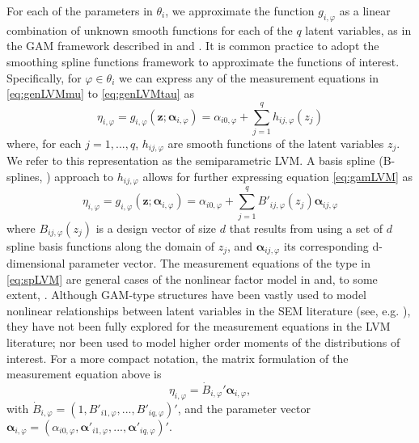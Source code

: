 \documentclass[11pt, a4paper]{article}
\begin{document}
For each of the parameters in $\theta_i$, we approximate the function $g_{i,\varphi}$ as a linear combination of unknown smooth functions for each of the $q$ latent variables, as in the GAM framework described in \citet{HT1990} and \citet{Woods2017}. It is common practice to adopt the smoothing spline functions \citep{Eilers&Marx_StatSci1996, deBoor2001} framework to approximate the functions of interest. Specifically, for $\varphi \in \theta_i$ we can express any of the measurement equations in \eqref{eq:genLVMmu} to \eqref{eq:genLVMtau} as
\begin{equation}
 \eta_{i,\varphi} = g_{i,\varphi}(\mathbf{z}; \bm{\alpha}_{i,\varphi}) = \alpha_{i0,\varphi} + \sum_{j=1}^{q} h_{ij,\varphi}(z_j) \label{eq:gamLVM}
\end{equation}
where, for each $j = 1,...,q$, $h_{ij,\varphi}$ are smooth functions of the latent variables $z_j$. We refer to this representation as the semiparametric LVM. A basis spline (B-splines, \citealp[chapter 9]{deBoor2001}) approach to $h_{ij,\varphi}$ allows for further expressing equation \eqref{eq:gamLVM} as 
\begin{equation}
 \eta_{i,\varphi} = g_{i,\varphi}(\mathbf{z}; \bm{\alpha}_{i,\varphi}) = \alpha_{i0,\varphi} + \sum_{j=1}^{q} B'_{ij,\varphi}(z_j) \bm{\alpha}_{ij, \varphi} \label{eq:spLVM}
\end{equation}
where $B_{ij,\varphi}(z_j)$ is a design vector of size $d$ that results from using a set of $d$ spline basis functions along the domain of $z_j$, and $\bm{\alpha}_{ij, \varphi}$ its corresponding d-dimensional parameter vector. The measurement equations of the type in \eqref{eq:spLVM} are general cases of the nonlinear factor model in \citet{Yalcin&Amemiya_StatSci2001, Rizopoulos&Moustaki_BJMSP2008} and, to some extent, \citet{Sardy&Victoria-Feser_StatComput2012}. Although GAM-type structures have been vastly used to model nonlinear relationships between latent variables in the SEM literature (see, e.g. \citealp{Song&Lu_JofCGStats2010, SongEtAl_Psychometrika2013, Finch_SEM2015}), they have not been fully explored for the measurement equations in the LVM literature; nor been used to model higher order moments of the distributions of interest. For a more compact notation, the matrix formulation of the measurement equation above is
\begin{equation}
\eta_{i,\varphi} = \dot{B}_{i,\varphi}' \bm{\alpha}_{i,\varphi},    \label{eq:spLVMmat}
\end{equation}
with $\dot{B}_{i,\varphi} = (1, B'_{i1,\varphi}, ..., B'_{iq,\varphi})'$, and the parameter vector $\bm{\alpha}_{i,\varphi} = (\alpha_{i0,\varphi}, \bm{\alpha}'_{i1, \varphi}, ..., \bm{\alpha}'_{iq, \varphi})'$.%
\end{document}
